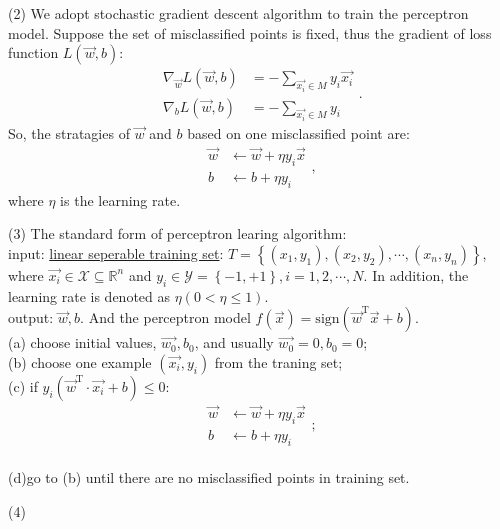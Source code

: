 \documentclass[10pt,onecolumn]{book}
\begin{document}
(2) We adopt stochastic gradient descent algorithm to train the perceptron model. Suppose the set of misclassified points is fixed, thus the gradient of loss function $L(\vec{w}, b)$:
\begin{equation}
\begin{split}
	\nabla_{\vec{w}}L(\vec{w}, b) & = - \sum_{\vec{x_i} \in M} y_i \vec{x_i} \\
	\nabla_{b}L(\vec{w}, b)       & = - \sum_{\vec{x_i} \in M} y_i
\end{split}.
\end{equation}
So, the stratagies of $\vec{w}$ and $b$ based on one misclassified point are:
\begin{equation}\label{eq:perceptron_parameter_update}
\begin{split}
	\vec{w} & \gets \vec{w} + \eta y_i \vec{x} \\
	b & \gets b + \eta y_i
\end{split},
\end{equation}
where $\eta$ is the learning rate.

(3) The standard form of perceptron learing algorithm: \\
\indent	\indent input: \uline{linear seperable training set}: $T = \left\{ (x_1, y_1), (x_2, y_2), \cdots, (x_n ,y_n) \right\}$, where $\vec{x_i} \in \mathcal{X} \subseteq \mathbb{R}^n$ and $y_i \in \mathcal{Y} = \left\{-1, +1\right\}, i = 1, 2, \cdots, N$. In addition, the learning rate is denoted 
as $\eta (0 < \eta \le 1)$. \\
\indent \indent output: $\vec{w}, b$. And the perceptron model $f(\vec{x}) = \mathrm{sign}(\vec{w}^\mathrm{T} \vec{x} + b)$. \\
\indent \indent (a) choose initial values, $\vec{w_0}, b_0$, and usually $\vec{w_0} = 0, b_0 = 0$; \\
\indent \indent (b) choose one example $(\vec{x_i}, y_i)$ from the traning set; \\
\indent \indent (c) if $y_{i} (\vec{w}^\mathrm{T}  \cdot \vec{x_{i}} + b) \le 0$:
\begin{equation}
\begin{split}
\vec{w} & \gets \vec{w} + \eta y_i \vec{x} \\
	b & \gets b + \eta y_i
\end{split};
\end{equation} \\
\indent \indent (d)go to (b) until there are no misclassified points in training set.


(4) 
\end{document}
